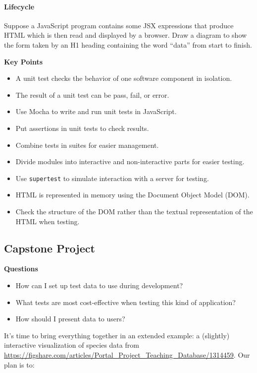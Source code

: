 \paragraph{Lifecycle}\label{lifecycle}

Suppose a JavaScript program contains some JSX expressions that produce
HTML which is then read and displayed by a browser. Draw a diagram to
show the form taken by an H1 heading containing the word ``data'' from
start to finish.

\textbf{Key Points}

\begin{itemize}
\tightlist
\item
  A unit test checks the behavior of one software component in
  isolation.
\item
  The result of a unit test can be pass, fail, or error.
\item
  Use Mocha to write and run unit tests in JavaScript.
\item
  Put assertions in unit tests to check results.
\item
  Combine tests in suites for easier management.
\item
  Divide modules into interactive and non-interactive parts for easier
  testing.
\item
  Use \texttt{supertest} to simulate interaction with a server for
  testing.
\item
  HTML is represented in memory using the Document Object Model (DOM).
\item
  Check the structure of the DOM rather than the textual representation
  of the HTML when testing.
\end{itemize}

\hypertarget{s:capstone}{\subsection{Capstone
Project}\label{s:capstone}}

\textbf{Questions}

\begin{itemize}
\tightlist
\item
  How can I set up test data to use during development?
\item
  What tests are most cost-effective when testing this kind of
  application?
\item
  How should I present data to users?
\end{itemize}

It's time to bring everything together in an extended example: a
(slightly) interactive visualization of species data from
\url{https://figshare.com/articles/Portal_Project_Teaching_Database/1314459}.
Our plan is to:

